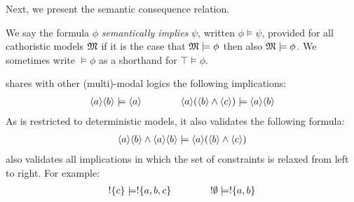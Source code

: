 
\NI Next, we present the semantic consequence relation.
\begin{definition} 
 We say the formula $\phi$ \emph{semantically implies} $\psi$, written $\phi
   \models \psi$, provided for all cathoristic models $\frak{M}$ if it is the
   case that $\frak{M} \models \phi$ then also $\frak{M} \models \phi$.
   We sometimes write $\models \phi$ as a shorthand for $\top \models \phi$.
\end{definition}

\NI \Cathoristic{} shares with other (multi)-modal logics the following
implications:
\begin{eqnarray*}
\langle a \rangle \langle b \rangle \models \langle a \rangle \qquad\qquad
\langle a \rangle (\langle b \rangle \land \langle c \rangle ) \models \langle a \rangle \langle b \rangle \end{eqnarray*}
As \cathoristic{} is restricted to deterministic models, it also
validates the following formula:
\begin{eqnarray*}
\langle a \rangle \langle b \rangle \land \langle a \rangle \langle b \rangle \models \langle a \rangle (\langle b \rangle \land \langle c \rangle )
\end{eqnarray*}
\Cathoristic{} also validates all implications in which the set of constraints is relaxed from left to right. For example:
\begin{eqnarray*}
! \{c\} \models ! \{a, b, c\} 
 \qquad\qquad
! \emptyset \models ! \{a, b\} 
\end{eqnarray*}

